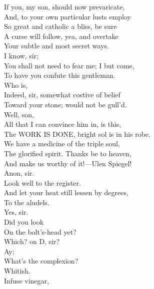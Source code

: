 \documentclass[a4paper,oneside]{memoir}
\begin{document}
\begin{drama*}
If you, my son, should now prevaricate,\\
And, to your own particular lusts employ\\
So great and catholic a bliss, be sure\\
A curse will follow, yea, and overtake\\
Your subtle and most secret ways.\\
\mammonspeaks {} I know, sir;\\
You shall not need to fear me; I but come,\\
To have you confute this gentleman.\\
\surlyspeaks {} Who is,\\
Indeed, sir, somewhat costive of belief\\
Toward your stone; would not be gull'd.\\
\subtlespeaks {} Well, son,\\
All that I can convince him in, is this,\\
The WORK IS DONE, bright sol is in his robe.\\
We have a medicine of the triple soul,\\
The glorified spirit. Thanks be to heaven,\\
And make us worthy of it!---Ulen Spiegel!\\
\facespeaks {} Anon, sir.\\
\subtlespeaks Look well to the register.\\
And let your heat still lessen by degrees,\\
To the aludels.\\
\facespeaks {}  Yes, sir.\\
\subtlespeaks {} Did you look\\
On the bolt's-head yet?\\
\facespeaks {}  Which? on D, sir?\\
\subtlespeaks {} Ay;\\
What's the complexion?\\
\facespeaks {}  Whitish.\\
\subtlespeaks {} Infuse vinegar,\\

\end{drama*}
\end{document}
